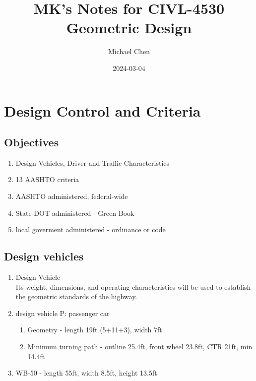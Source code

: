 \documentclass{article}
\title{MK's Notes for CIVL-4530 Geometric Design}
\date{2024-03-04}
\author{Michael Chen}
\begin{document}
  \setcounter{section}{1}




  \section{Design Control and Criteria}
  \subsection{Objectives}
  \begin{enumerate}
    \item Design Vehicles, Driver and Traffic Characteristics
    \item 13 AASHTO criteria
    \item AASHTO administered, federal-wide
    \item State-DOT administered - Green Book
    \item local goverment administered - ordinance or code
  \end{enumerate}

  \subsection{Design vehicles}
  \begin{enumerate}
    \item Design Vehicle\\ 
    Its weight, dimensions, and operating characteristics will be used to establish the geometric standards of the highway.
    \item design vehicle P: passenger car
    \begin{enumerate}
      \item Geometry - length 19ft (5+11+3), width 7ft
      \item Minimum turning path - outline 25.4ft, front wheel 23.8ft, CTR 21ft, min 14.4ft 
    \end{enumerate}
    \item WB-50 - length 55ft, width 8.5ft, height 13.5ft
  \end{enumerate}
\end{document}
